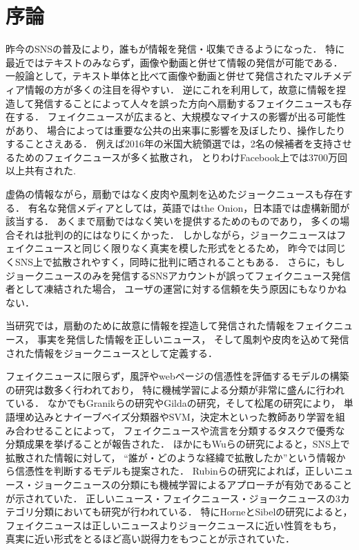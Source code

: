 \chapter{序論}\label{ch:introduction}
%
昨今のSNSの普及により，誰もが情報を発信・収集できるようになった．
特に最近ではテキストのみならず，画像や動画と併せて情報の発信が可能である．
一般論として，テキスト単体と比べて画像や動画と併せて発信されたマルチメディア情報の方が多くの注目を得やすい．
逆にこれを利用して，故意に情報を捏造して発信することによって人々を誤った方向へ扇動するフェイクニュースも存在する．
フェイクニュースが広まると、大規模なマイナスの影響が出る可能性があり、
場合によっては重要な公共の出来事に影響を及ぼしたり、操作したりすることさえある．
例えば2016年の米国大統領選では，2名の候補者を支持させるためのフェイクニュースが多く拡散され，
とりわけFacebook上では3700万回以上共有された\cite{10.1257/jep.31.2.211}.

虚偽の情報ながら，扇動ではなく皮肉や風刺を込めたジョークニュースも存在する．
有名な発信メディアとしては，英語ではthe Onion，日本語では虚構新聞が該当する．
あくまで扇動ではなく笑いを提供するためのものであり，
多くの場合それは批判の的にはなりにくかった．
しかしながら，ジョークニュースはフェイクニュースと同じく限りなく真実を模した形式をとるため，
昨今では同じくSNS上で拡散されやすく，同時に批判に晒されることもある．
さらに，もしジョークニュースのみを発信するSNSアカウントが誤ってフェイクニュース発信者として凍結された場合，
ユーザの運営に対する信頼を失う原因にもなりかねない．

当研究では，扇動のために故意に情報を捏造して発信された情報をフェイクニュース，
事実を発信した情報を正しいニュース，
そして風刺や皮肉を込めて発信された情報をジョークニュースとして定義する．

フェイクニュースに限らず，風評やwebページの信憑性を評価するモデルの構築の研究は数多く行われており，
特に機械学習による分類が非常に盛んに行われている．
なかでもGranikらの研究\cite{Granik8100379}やGildaの研究\cite{Gilda8305411}，そして松尾の研究\cite{松尾省吾2018master}により，
単語埋め込みとナイーブベイズ分類器やSVM，決定木といった教師あり学習を組み合わせることによって，
フェイクニュースや流言を分類するタスクで優秀な分類成果を挙げることが報告された．
ほかにもWuらの研究\cite{Wu:2018:TFF:3159652.3159677}によると，SNS上で拡散された情報に対して，
``誰が・どのような経緯で拡散したか''という情報から信憑性を判断するモデルも提案された． 
Rubinらの研究\cite{W16-0802}によれば，正しいニュース・ジョークニュースの分類にも機械学習によるアプローチが有効であることが示されていた．
正しいニュース・フェイクニュース・ジョークニュースの3カテゴリ分類においても研究が行われている．
特にHorneとSibelの研究\cite{DBLP:journals/corr/HorneA17}によると，フェイクニュースは正しいニュースよりジョークニュースに近い性質をもち，
真実に近い形式をとるほど高い説得力をもつことが示されていた．

